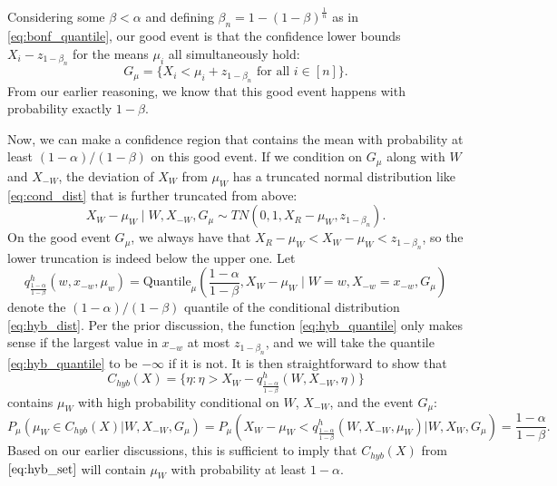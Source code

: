 \documentclass{article}
\begin{document}
Considering some $\beta < \alpha$ and defining $\beta_n = 1 - (1-\beta)^{\frac{1}{n}}$ as in \eqref{eq:bonf_quantile}, our good event is that the confidence lower bounds $X_i -  z_{1-\beta_n}$ for the means $\mu_i$ all simultaneously hold:
\begin{equation*}
    G_{\mu} = \{X_i < \mu_i + z_{1-\beta_n} \text{ for all } i \in [n] \}.
\end{equation*}
From our earlier reasoning, we know that this good event happens with probability exactly $1-\beta$. 

Now, we can make a confidence region that contains the mean with probability at least $(1-\alpha)/(1-\beta)$ on this good event. If we condition on $G_{\mu}$ along with $W$ and $X_{-W}$, the deviation of $X_W$ from $\mu_W$ has a truncated normal distribution like \eqref{eq:cond_dist} that is further truncated from above:
\begin{equation}
    \label{eq:hyb_dist}
    X_W - \mu_W \mid W, X_{-W}, G_{\mu} \sim TN(0, 1, X_{R} - \mu_{W}, z_{1-\beta_n} ).
\end{equation}
On the good event $G_{\mu}$, we always have that $X_R - \mu_{W} < X_W - \mu_{W} < z_{1-\beta_n}$, so the lower truncation is indeed below the upper one. Let
\begin{equation}
\label{eq:hyb_quantile}
    q^{h}_{\frac{1-\alpha}{1-\beta}}(w, x_{-w}, \mu_w) = \text{Quantile}_{\mu}\left(\frac{1-\alpha}{1-\beta}, X_W -  \mu_{W} \mid W=w, X_{-w} = x_{-w}, G_{\mu}\right)
\end{equation}
denote the $(1-\alpha)/(1-\beta)$ quantile of the conditional distribution \eqref{eq:hyb_dist}. Per the prior discussion, the function \eqref{eq:hyb_quantile} only makes sense if the largest value in $x_{-w}$ at most $z_{1-\beta_n}$, and we will take the quantile \eqref{eq:hyb_quantile} to be $-\infty$ if it is not. It is then straightforward to show that
\begin{equation}
\label{eq:hyb_set}
     C_{hyb}(X) = \{\eta : \eta > X_{W} - q^{h}_{\frac{1-\alpha}{1-\beta}}(W, X_{-W}, \eta)  \} 
\end{equation}
contains $\mu_{W}$ with high probability conditional on $W$, $X_{-W}$, and the event $G_{\mu}$:
\begin{equation*}
    P_{\mu}( \mu_{W} \in C_{hyb}(X) | W, X_{-W}, G_{\mu})  = P_{\mu}( X_W - \mu_W < q^{h}_{\frac{1-\alpha}{1-\beta}}(W, X_{-W}, \mu_{W}) |W, X_W, G_{\mu}) = \frac{1-\alpha}{1-\beta}.
\end{equation*}
Based on our earlier discussions, this is sufficient to imply that $C_{hyb}(X)$ from $\eqref{eq:hyb_set}$ will contain $\mu_{W}$ with probability at least $1-\alpha$. 
\end{document}

